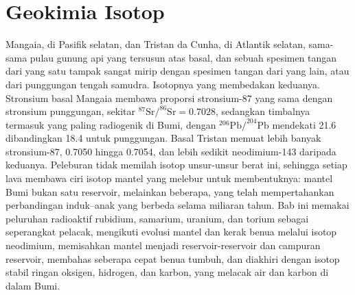 \chapter{Geokimia Isotop}\label{ch:b2:isotope-geochemistry}

Mangaia, di Pasifik selatan, dan Tristan da Cunha, di Atlantik
selatan, sama-sama pulau gunung api yang tersusun atas basal, dan sebuah spesimen tangan dari
yang satu tampak sangat mirip dengan spesimen tangan dari yang lain, atau dari punggungan tengah samudra.
Isotopnya yang membedakan keduanya. Stronsium basal Mangaia membawa
proporsi stronsium-87 yang sama dengan stronsium punggungan, sekitar
$^{87}\mathrm{Sr}/^{86}\mathrm{Sr} = 0.7028$, sedangkan timbalnya termasuk yang paling
radiogenik di Bumi, dengan $^{206}\mathrm{Pb}/^{204}\mathrm{Pb}$ mendekati 21.6 dibandingkan
18.4 untuk punggungan. Basal Tristan memuat lebih banyak stronsium-87, 0.7050 hingga
0.7054, dan lebih sedikit neodimium-143 daripada keduanya. Peleburan tidak memilah isotop
unsur-unsur berat ini, sehingga setiap lava membawa ciri isotop
mantel yang melebur untuk membentuknya: mantel Bumi bukan satu reservoir, melainkan
beberapa, yang telah mempertahankan perbandingan induk--anak yang berbeda selama miliaran
tahun. Bab ini memakai peluruhan radioaktif rubidium, samarium, uranium,
dan torium sebagai seperangkat pelacak, mengikuti evolusi mantel dan
kerak benua melalui isotop neodimium, memisahkan mantel menjadi
reservoir-reservoir dan campuran reservoir, membahas seberapa cepat benua tumbuh,
dan diakhiri dengan isotop stabil ringan oksigen, hidrogen, dan karbon, yang
melacak air dan karbon di dalam Bumi.

